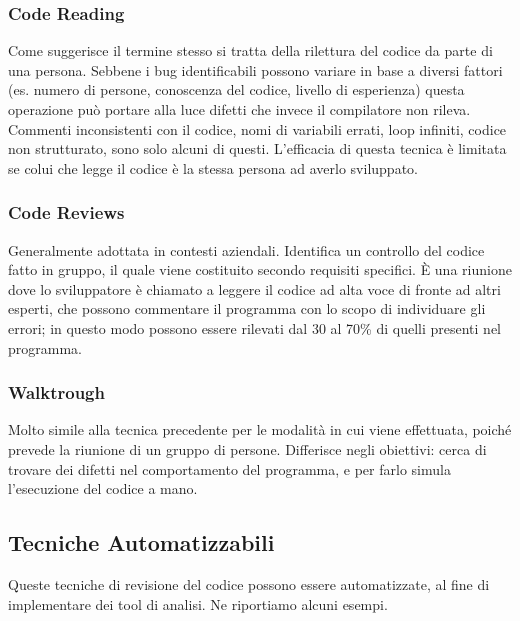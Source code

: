         \subsubsection{Code Reading}

        Come suggerisce il termine stesso si tratta della rilettura del codice da parte di una persona. Sebbene i bug identificabili possono variare in base a diversi fattori (es. numero di persone, conoscenza del codice, livello di esperienza) questa operazione può portare alla luce difetti che invece il compilatore non rileva. Commenti inconsistenti con il codice, nomi di variabili errati, loop infiniti, codice non strutturato, sono solo alcuni di questi. L'efficacia di questa tecnica è limitata se colui che legge il codice è la stessa persona ad averlo sviluppato.\newline

        \subsubsection{Code Reviews}

        Generalmente adottata in contesti aziendali. Identifica un controllo del codice fatto in gruppo, il quale viene costituito secondo requisiti specifici. \`E una riunione dove lo sviluppatore è chiamato a leggere il codice ad alta voce di fronte ad altri esperti, che possono commentare il programma con lo scopo di individuare gli errori; in questo modo possono essere rilevati dal 30 al 70\% di quelli presenti nel programma.\newline

        \subsubsection{Walktrough}

        Molto simile alla tecnica precedente per le modalità in cui viene effettuata, poiché prevede la riunione di un gruppo di persone. Differisce negli obiettivi: cerca di trovare dei difetti nel comportamento del programma, e per farlo simula l'esecuzione del codice a mano.\newline
        
    \subsection{Tecniche Automatizzabili}
    
    Queste tecniche di revisione del codice possono essere automatizzate, al fine di implementare dei tool di analisi. Ne riportiamo alcuni esempi.\newline

